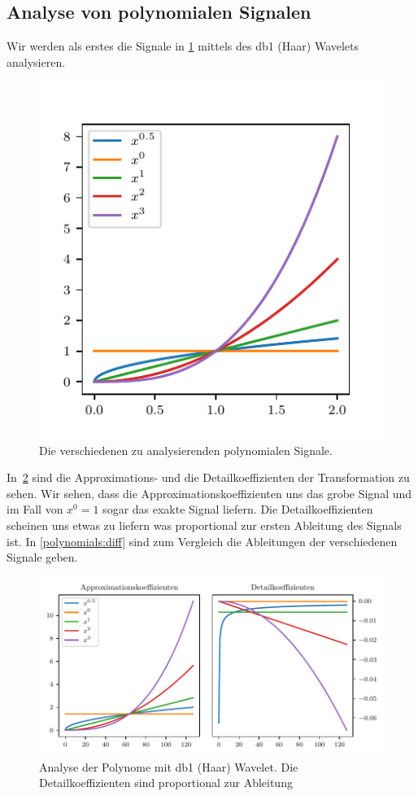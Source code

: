 \begin{refsection}
\section{Analyse von polynomialen Signalen}

Wir werden als erstes die Signale in \cref{polynomials:signals} mittels des db1
(Haar) Wavelets analysieren.
\begin{figure}
    \centering
    \includegraphics{papers/polynomials/images/polynomials_signals.pdf}
    \caption{Die verschiedenen zu analysierenden polynomialen Signale.\label{polynomials:signals}}
\end{figure}
In~\cref{polynomials:haar} sind die Approximations- und die Detailkoeffizienten
der Transformation zu sehen. Wir sehen, dass die Approximationskoeffizienten
uns das grobe Signal und im Fall von $x^0 = 1$ sogar das exakte Signal liefern.
Die Detailkoeffizienten scheinen uns etwas zu liefern was proportional zur
ersten Ableitung des Signals ist. In \cref{polynomials:diff} sind zum Vergleich
die Ableitungen der verschiedenen Signale geben.

\begin{figure}
    \centering
    \includegraphics{papers/polynomials/images/polynomials_signals_db1.pdf}
    \caption{Analyse der Polynome mit db1 (Haar) Wavelet. Die
             Detailkoeffizienten sind proportional zur
             Ableitung\label{polynomials:haar}}
\end{figure}


\end{refsection}
